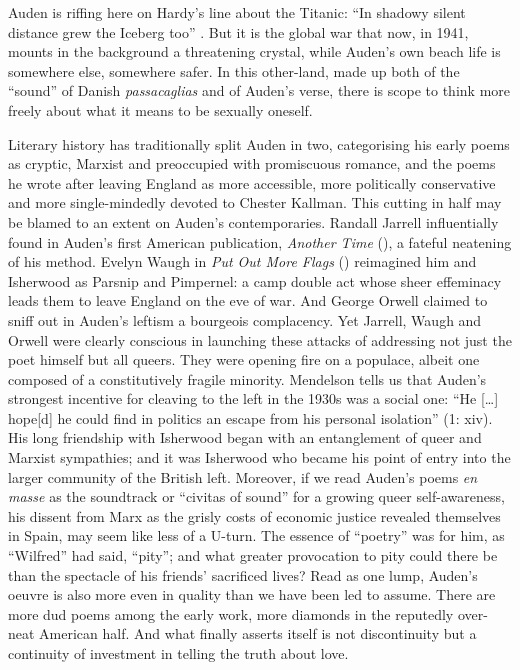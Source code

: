 \begin{review}
\noindent Auden is riffing here on Hardy's line about the Titanic: ``In shadowy
silent distance grew the Iceberg too'' \parencite[248]{hardy_complete_1976}. But it is the
global war that now, in 1941, mounts in the background a threatening
crystal, while Auden's own beach life is somewhere else, somewhere
safer. In this other-land, made up both of the ``sound'' of Danish
\emph{passacaglias} and of Auden's verse, there is scope to think more freely
about what it means to be sexually oneself.

Literary history has traditionally split Auden in two, categorising his
early poems as cryptic, Marxist and preoccupied with promiscuous
romance, and the poems he wrote after leaving England as more
accessible, more politically conservative and more single-mindedly devoted to
Chester Kallman. This cutting in half may be blamed to an extent on
Auden's contemporaries. Randall Jarrell influentially found in Auden's
first American publication, \emph{Another Time} (\citeyear{auden_another_1940}), a fateful
neatening of his method. Evelyn Waugh in \emph{Put Out More Flags} (\citeyear{waugh_put_1942})
reimagined him and Isherwood as Parsnip and Pimpernel: a camp double act
whose sheer effeminacy leads them to leave England on the eve of war.
And George Orwell claimed to sniff out in Auden's leftism a bourgeois
complacency. Yet Jarrell, Waugh and Orwell were clearly conscious in
launching these attacks of addressing not just the poet himself but all queers. They were opening fire on a populace, albeit one composed
of a constitutively fragile minority. Mendelson tells us that
Auden's strongest incentive for cleaving to the left in the 1930s was a
social one: ``He [\dots] hope{[}d{]} he could find in politics an
escape from his personal isolation'' (1: xiv). His long friendship with
Isherwood began with an entanglement of queer and Marxist sympathies;
and it was Isherwood who became his point of entry into the larger
community of the British left. Moreover, if we read Auden's poems
\emph{en masse} as the soundtrack or ``civitas of sound'' for a growing
queer self-awareness, his dissent from Marx as the grisly costs of
economic justice revealed themselves in Spain, may seem like less of a
U-turn. The essence of ``poetry'' was for him, as ``Wilfred'' had said,
``pity''; and what greater provocation to pity could there be than the spectacle of his friends' sacrificed lives? Read as one lump, Auden's oeuvre is also more
even in quality than we have been led to assume. There are more dud
poems among the early work, more diamonds in the reputedly over-neat
American half. And what finally asserts itself is not discontinuity but
a continuity of investment in telling the truth about love.


\end{review}
